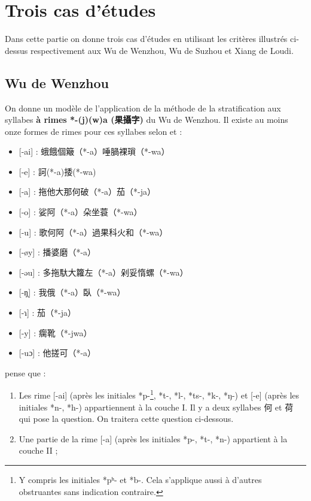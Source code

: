 \documentclass{scrbook}
\newcounter{c}[subsubsection]
\newcommand{\termyyx}[1]{\textbf{#1}}
\begin{document}
\begin{sloppypar}
\chapter{Trois cas d'études}\label{cas_etudes}
Dans cette partie on donne trois cas d'études en utilisant les critères illustrés ci-dessus respectivement aux Wu de Wenzhou, Wu de Suzhou et Xiang de Loudi.

\section{Wu de Wenzhou}\label{couche_guo_wenzhou}
On donne un modèle de l'application de la méthode de la stratification aux syllabes \termyyx{à rimes *-(j)(w)a (果攝字)} du Wu de Wenzhou. Il existe au moins onze formes de rimes pour ces syllabes selon \textcite[11--12]{Wu2005wenzhou} et \textcite[21--22, 101]{Zhengzhang2008wenzhou} :

\begin{itemize}
\item{[-ai] : 蛾餓個簸（*-a）唾腡裸瑣（*-wa）}
\item{[-e] : 訶(*-a)捼(*-wa)}
\item{[-a] : 拖他大那何破（*-a）茄（*-ja）}
\item{[-o] : 娑阿（*-a）朵坐蓑（*-wa）}
\item{[-u] : 歌何阿（*-a）過果科火和（*-wa）}
\item{[-øy] : 播婆磨（*-a）}
\item{[-əu] : 多拖馱大籮左（*-a）剁妥惰螺（*-wa）}
\item{[-ŋ̩] : 我俄（*-a）臥（*-wa）}
\item{[-ɿ] : 茄（*-ja）}
\item{[-y] : 瘸靴（*-jwa）}
\item{[-uɔ] : 他搓可（*-a）}
\end{itemize} 

\textcite[21--22, 101]{Zhengzhang2008wenzhou} pense que :

\begin{enumerate}
\item{Les rime [-ai] (après les initiales *p-\footnote{Y compris les initiales *pʰ- et *b-. Cela s'applique aussi à d'autres obstruantes sans indication contraire.}, *t-, *l-, *ts-, *k-, *ŋ-) et [-e] (après les initiales *n-, *h-) appartiennent à la couche I. Il y a deux syllabes 何 et 荷 qui pose la question. On traitera cette question ci-dessous.}

\item{Une partie de la rime [-a] (après les initiales *p-, *t-, *n-) appartient à la couche II ;}


\end{enumerate}
\end{sloppypar}
\end{document}
